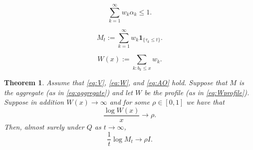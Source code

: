 \documentclass[10pt,a4paper]{amsart}
\newtheorem{theorem}{Theorem}
\newcommand{\ind}[1]{\mathbf{1}_{\{#1\}}}
\begin{document}
\begin{equation}\label{eq:W}
\sum_{k=1}^{\infty}w_k\alpha_k\le 1.    
\end{equation}

\begin{equation}\label{eq:aggregate}
M_t:=\sum_{k=1}^\infty w_k \ind{\tau_k\le t}.
\end{equation}

\begin{equation}\label{eq:Wprofile}
W(x):=\sum_{k:b_k\le x}w_k.    
\end{equation}

\begin{theorem}\label{thm:main}
Assume that \eqref{eq:V}, \eqref{eq:W}, and \eqref{eq:AO} hold. Suppose that $M$ is the aggregate (as in \eqref{eq:aggregate}) and let $W$ be the profile (as in \eqref{eq:Wprofile}). Suppose in addition $W(x)\to\infty$ and for some $\rho\in[0,1]$ we have that
    \begin{equation}\label{eq:R}
    \frac{\log W(x)}{x}\longrightarrow \rho.   
    \end{equation}
    Then, almost surely under $Q$ as $t\to\infty$,
    \begin{equation}\label{eq:G}
    \boxed{
    \frac{1}{t}\log M_t\longrightarrow \rho I.  
    }
    \end{equation}
\end{theorem}
\end{document}
